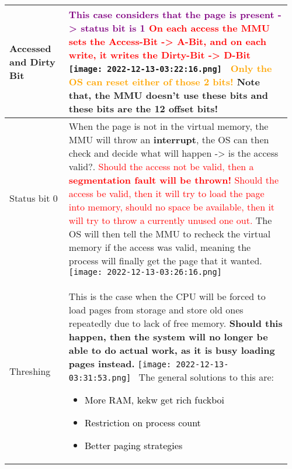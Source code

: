 \documentclass[main.tex,fontsize=8pt,paper=a4,paper=portrait,DIV=calc,]{scrartcl}
\begin{document}
\begin{table}[ht!]
\begin{tabular}{|m{0.2\linewidth}|m{0.755\linewidth}|}
\hline
Accessed and Dirty Bit &
\textcolor{purple}{This case considers that the page is present -> status bit is 1}\newline
\textcolor{red}{On each \textbf{access the MMU sets the Access-Bit -> A-Bit}, and on each \textbf{write, it writes the Dirty-Bit -> D-Bit}}\newline
\texttt{[image: 2022-12-13-03:22:16.png]}
\, \newline
\textcolor{orange}{\textbf{Only the OS can reset either of those 2 bits!}} 
Note that, the MMU doesn't use these bits and these bits are the 12 offset bits!\\
\hline
Status bit 0 & 
When the page is not in the virtual memory, the MMU will throw an \textbf{interrupt}, the OS can then check and decide what will happen -> is the access valid?.\newline
\textcolor{red}{Should the access not be valid, then a \textbf{segmentation fault will be thrown!}\newline
Should the access be valid, then it will try to load the page into memory, should no space be available, then it will try to throw a currently unused one out.}\newline
The OS will then tell the MMU to recheck the virtual memory if the access was valid, meaning the process will finally get the page that it wanted.\newline
\texttt{[image: 2022-12-13-03:26:16.png]}\\
\hline
Threshing & 
This is the case when the CPU will be forced to load pages from storage and store old ones repeatedly due to lack of free memory.\newline
\textbf{Should this happen, then the system will no longer be able to do actual work, as it is busy loading pages instead.}\newline
\texttt{[image: 2022-12-13-03:31:53.png]}
\, \newline
The general solutions to this are: \newline
\begin{itemize}
\item \textcolor{black}{More RAM, kekw get rich fuckboi}
\item \textcolor{black}{Restriction on process count}
\item \textcolor{black}{Better paging strategies}
\vspace{-3mm}

\end{itemize}
\end{tabular}
\end{table}
\end{document}
